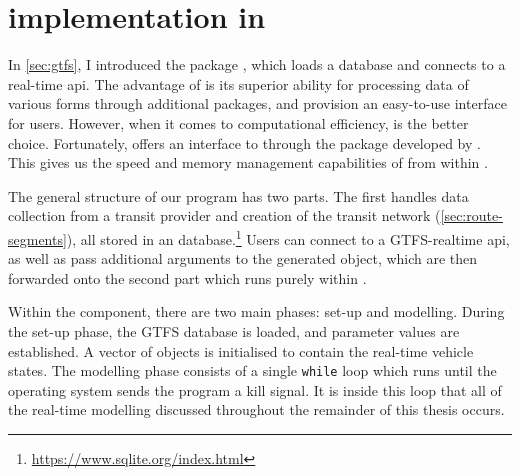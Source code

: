 

\section{\Rt{} implementation in }
\label{sec:rt-implementation}

In \cref{sec:gtfs}, I introduced the \Rstats{} package , which loads a \GTFS{} database and connects to a real-time \gls{api}. The advantage of \Rstats{} \citep{rcore} is its superior ability for processing data of various forms through additional packages, and provision an easy-to-use interface for users. However, when it comes to computational efficiency, \Cpp{} is the better choice. Fortunately, \Rstats{} offers an interface to \Cpp{} through the  package developed by \citet{Rcpp}. This gives us the speed and memory management capabilities of \Cpp{} from within \Rstats{}.

The general structure of our program has two parts. The first handles data collection from a transit provider and creation of the transit network (\cref{sec:route-segments}), all stored in an  database.\footnote{\url{https://www.sqlite.org/index.html}} Users can connect to a GTFS-realtime \gls{api}, as well as pass additional arguments to the generated  object, which are then forwarded onto the second part which runs purely within \Cpp{}.

Within the \Cpp{} component, there are two main phases: set-up and modelling. During the set-up phase, the GTFS database is loaded, and parameter values are established. A vector of  objects is initialised to contain the real-time vehicle states. The modelling phase consists of a single \verb+while+ loop which runs until the operating system sends the program a kill signal. It is inside this loop that all of the real-time modelling discussed throughout the remainder of this thesis occurs.

